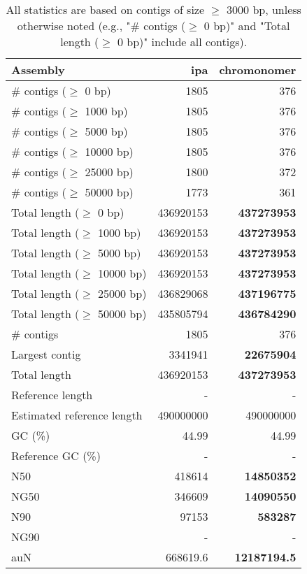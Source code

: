 \documentclass[12pt,a4paper]{article}
\begin{document}
\begin{table}[ht]
\begin{center}
\caption{All statistics are based on contigs of size $\geq$ 3000 bp, unless otherwise noted (e.g., "\# contigs ($\geq$ 0 bp)" and "Total length ($\geq$ 0 bp)" include all contigs).}
\begin{tabular}{|l*{2}{|r}|}
\hline
Assembly & ipa & chromonomer \\ \hline
\# contigs ($\geq$ 0 bp) & 1805 & 376 \\ \hline
\# contigs ($\geq$ 1000 bp) & 1805 & 376 \\ \hline
\# contigs ($\geq$ 5000 bp) & 1805 & 376 \\ \hline
\# contigs ($\geq$ 10000 bp) & 1805 & 376 \\ \hline
\# contigs ($\geq$ 25000 bp) & 1800 & 372 \\ \hline
\# contigs ($\geq$ 50000 bp) & 1773 & 361 \\ \hline
Total length ($\geq$ 0 bp) & 436920153 & {\bf 437273953} \\ \hline
Total length ($\geq$ 1000 bp) & 436920153 & {\bf 437273953} \\ \hline
Total length ($\geq$ 5000 bp) & 436920153 & {\bf 437273953} \\ \hline
Total length ($\geq$ 10000 bp) & 436920153 & {\bf 437273953} \\ \hline
Total length ($\geq$ 25000 bp) & 436829068 & {\bf 437196775} \\ \hline
Total length ($\geq$ 50000 bp) & 435805794 & {\bf 436784290} \\ \hline
\# contigs & 1805 & 376 \\ \hline
Largest contig & 3341941 & {\bf 22675904} \\ \hline
Total length & 436920153 & {\bf 437273953} \\ \hline
Reference length & - & - \\ \hline
Estimated reference length & 490000000 & 490000000 \\ \hline
GC (\%) & 44.99 & 44.99 \\ \hline
Reference GC (\%) & - & - \\ \hline
N50 & 418614 & {\bf 14850352} \\ \hline
NG50 & 346609 & {\bf 14090550} \\ \hline
N90 & 97153 & {\bf 583287} \\ \hline
NG90 & - & - \\ \hline
auN & 668619.6 & {\bf 12187194.5} \\ \hline

\end{tabular}
\end{center}
\end{table}
\end{document}
